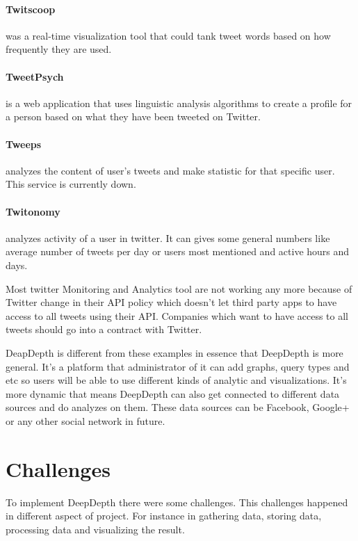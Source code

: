 \documentclass[a4paper,11pt]{report}
\begin{document}
\paragraph{Twitscoop} was a real-time visualization tool that could tank tweet words based on how frequently they are used.\cite{twitscoop}

\paragraph{TweetPsych} is a web application that uses linguistic analysis algorithms to create a profile for a person based on what they have been tweeted on Twitter.\cite{tweetpsych}

\paragraph{Tweeps} analyzes the content of user's tweets and make statistic for that specific user. This service is currently down.\cite{tweeps}

\paragraph{Twitonomy} analyzes activity of a user in twitter. It can gives some general numbers like average number of tweets per day or users most mentioned and active hours and days. \cite{twitonomy}

Most twitter Monitoring and Analytics tool are not working any more because of Twitter change in their API policy which doesn't let third party apps to have access to all tweets using their API. Companies which want to have access to all tweets should go into a contract with Twitter\cite{twitterfirehose}.

DeapDepth is different from these examples in essence that DeepDepth is more general. It's a platform that administrator of it can add graphs, query types and etc so users will be able to use different kinds of analytic and visualizations. It's more dynamic that means DeepDepth can also get connected to different data sources and do analyzes on them. These data sources can be Facebook, Google+ or any other social network in future.

\section{Challenges}

To implement DeepDepth there were some challenges. This challenges happened in different aspect of project. For instance in gathering data, storing data, processing data and visualizing the result.
\end{document}
